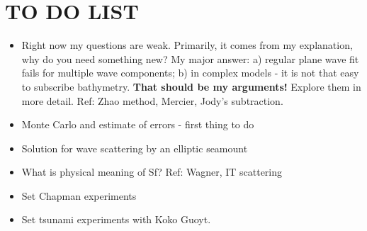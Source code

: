 


\section{TO DO LIST}
\begin{itemize}
\item Right now my questions are weak. Primarily, it comes from my explanation, why do you need something new? My major answer: a) regular plane wave fit fails for multiple wave components; b) in complex models - it is not that easy to subscribe bathymetry. \textbf{That should be my arguments!} Explore them in more detail. Ref: Zhao method, Mercier, Jody's subtraction.

\item Monte Carlo and estimate of errors - first thing to do

\item Solution for wave scattering by an elliptic seamount

\item What is physical meaning of Sf? Ref: Wagner, IT scattering

\item Set Chapman experiments

\item Set tsunami experiments with Koko Guoyt.
\end{itemize}

